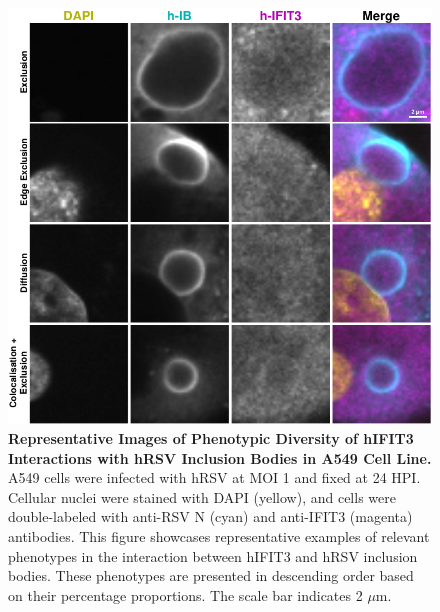 \begin{figure}
    \centering
    \includegraphics[width=1\linewidth]{08. Chapter 3/Figs/02. Infection/03. IFIT3/03. a549 i3.pdf}
    \caption[Representative Images of Phenotypic Diversity of hIFIT3 Interactions with hRSV Inclusion Bodies in A549 Cell Line.]{\textbf{Representative Images of Phenotypic Diversity of hIFIT3 Interactions with hRSV Inclusion Bodies in A549 Cell Line.} A549 cells were infected with hRSV at MOI 1 and fixed at 24 HPI. Cellular nuclei were stained with DAPI (yellow), and cells were double-labeled with anti-RSV N (cyan) and anti-IFIT3 (magenta) antibodies. This figure showcases representative examples of relevant phenotypes in the interaction between hIFIT3 and hRSV inclusion bodies. These phenotypes are presented in descending order based on their percentage proportions. The scale bar indicates 2 \(\mu \mbox{m}\).}
    \label{fig:Representative Images of Phenotypic Diversity of hIFIT3 Interactions with hRSV Inclusion Bodies in A549 Cell Line}
\end{figure}

